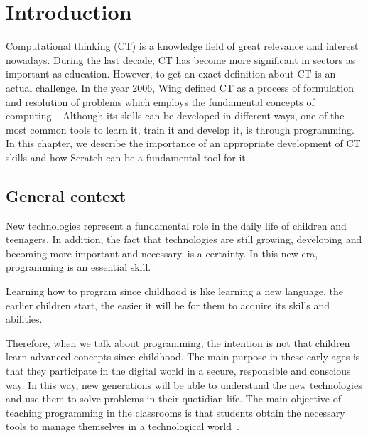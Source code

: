 

\cleardoublepage
\chapter{Introduction}
\label{chap:introduction}

Computational thinking (CT) is a knowledge field of great relevance and interest nowadays. During the last decade, CT has become more significant in sectors as important as education. However, to get an exact definition about CT is an actual challenge. In the year 2006, Wing defined CT as a process of formulation and resolution of problems which employs the fundamental concepts of computing~\cite{wing:_ct}. Although its skills can be developed in different ways, one of the most common tools to learn it, train it and develop it, is through programming. In this chapter, we describe the importance of an appropriate development of CT skills and how Scratch can be a fundamental tool for it. 


\section{General context}
\label{sec:context}

New technologies represent a fundamental role in the daily life of children and teenagers. In addition, the fact that technologies are still growing, developing and becoming more important and necessary, is a certainty. In this new era, programming is an essential skill. 

Learning how to program since childhood is like learning a new language, the earlier children start, the easier it will be for them to acquire its skills and abilities.

Therefore, when we talk about programming, the intention is not that children learn advanced concepts since childhood. The main purpose in these early ages is that they participate in the digital world in a secure, responsible and conscious way. In this way, new generations will be able to understand the new technologies and use them to solve problems in their quotidian life. The main objective of teaching programming in the classrooms is that students obtain the necessary tools to manage themselves in a technological world~\cite{mangifesta:_importancia}. 


